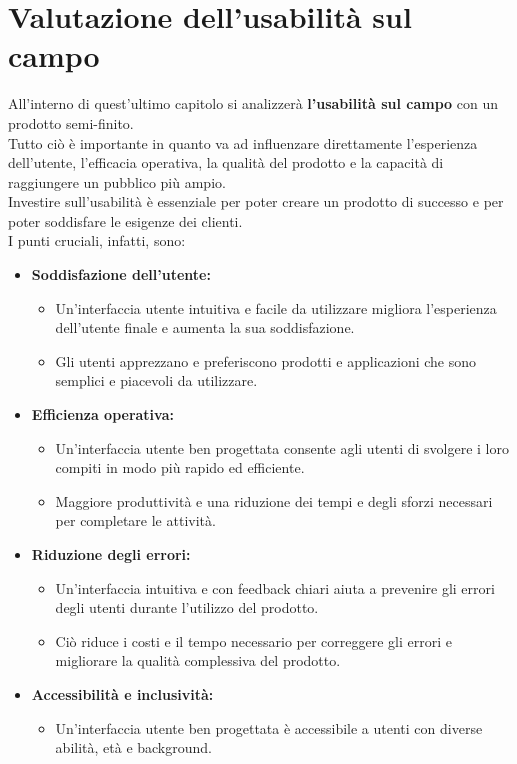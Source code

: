 \documentclass{article}
\begin{document}
	\section{Valutazione dell'usabilità sul campo}
	All'interno di quest'ultimo capitolo si analizzerà \textbf{l'usabilità sul campo} con un prodotto semi-finito.\\
	Tutto ciò è importante in quanto va ad influenzare direttamente l'esperienza dell'utente, l'efficacia operativa, la qualità del prodotto e la capacità di raggiungere un pubblico più ampio.\\
	Investire sull'usabilità è essenziale per poter creare un prodotto di successo e per poter soddisfare le esigenze dei clienti.\\
	I punti cruciali, infatti, sono:
	\begin{itemize}
		\item \textbf{Soddisfazione dell'utente:}
		\begin{itemize}
			\item Un'interfaccia utente intuitiva e facile da utilizzare migliora l'esperienza dell'utente finale e aumenta la sua soddisfazione.
			\item Gli utenti apprezzano e preferiscono prodotti e applicazioni che sono semplici e piacevoli da utilizzare.
		\end{itemize}
		\item \textbf{Efficienza operativa:}
		\begin{itemize}
			\item Un'interfaccia utente ben progettata consente agli utenti di svolgere i loro compiti in modo più rapido ed efficiente.
			\item Maggiore produttività e una riduzione dei tempi e degli sforzi necessari per completare le attività.
		\end{itemize}
		\item \textbf{Riduzione degli errori:}
		\begin{itemize}
			\item Un'interfaccia intuitiva e con feedback chiari aiuta a prevenire gli errori degli utenti durante l'utilizzo del prodotto.
			\item Ciò riduce i costi e il tempo necessario per correggere gli errori e migliorare la qualità complessiva del prodotto.
		\end{itemize}
		\item \textbf{Accessibilità e inclusività:}
		\begin{itemize}
			\item Un'interfaccia utente ben progettata è accessibile a utenti con diverse abilità, età e background.

\end{itemize}
\end{itemize}
\end{document}
